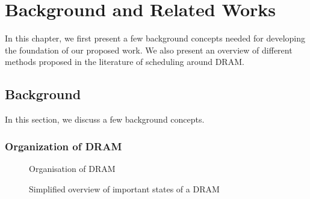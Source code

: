 \chapter{Background and Related Works}\label{ch2}
\noindent
In this chapter, we first present a few background concepts needed for developing the foundation of our proposed work. We 
also present an overview of different methods proposed in the literature of scheduling around DRAM.

\section{Background}\label{back}
\noindent
In this section, we discuss a few background concepts.

\subsection{Organization of DRAM}\label{b1}

\begin{figure}[t]
\centering
{}
\caption{Organisation of DRAM}
\label{fig3}
\end{figure}



\begin{figure}[t]
\centering
{}
\caption{Simplified overview of important states of a DRAM}
\label{fig4}
\end{figure}



